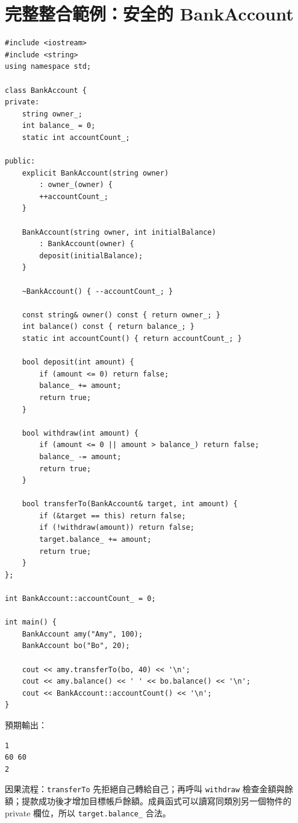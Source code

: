 \documentclass[11pt,a4paper]{article}
\newcommand{\code}[1]{\texttt{#1}}
\begin{document}
\section{完整整合範例：安全的 BankAccount}

\begin{lstlisting}
#include <iostream>
#include <string>
using namespace std;

class BankAccount {
private:
    string owner_;
    int balance_ = 0;
    static int accountCount_;

public:
    explicit BankAccount(string owner)
        : owner_(owner) {
        ++accountCount_;
    }

    BankAccount(string owner, int initialBalance)
        : BankAccount(owner) {
        deposit(initialBalance);
    }

    ~BankAccount() { --accountCount_; }

    const string& owner() const { return owner_; }
    int balance() const { return balance_; }
    static int accountCount() { return accountCount_; }

    bool deposit(int amount) {
        if (amount <= 0) return false;
        balance_ += amount;
        return true;
    }

    bool withdraw(int amount) {
        if (amount <= 0 || amount > balance_) return false;
        balance_ -= amount;
        return true;
    }

    bool transferTo(BankAccount& target, int amount) {
        if (&target == this) return false;
        if (!withdraw(amount)) return false;
        target.balance_ += amount;
        return true;
    }
};

int BankAccount::accountCount_ = 0;

int main() {
    BankAccount amy("Amy", 100);
    BankAccount bo("Bo", 20);

    cout << amy.transferTo(bo, 40) << '\n';
    cout << amy.balance() << ' ' << bo.balance() << '\n';
    cout << BankAccount::accountCount() << '\n';
}
\end{lstlisting}

預期輸出：
\begin{lstlisting}[language={}]
1
60 60
2
\end{lstlisting}

因果流程：\code{transferTo} 先拒絕自己轉給自己；再呼叫 \code{withdraw} 檢查金額與餘額；提款成功後才增加目標帳戶餘額。成員函式可以讀寫同類別另一個物件的 private 欄位，所以 \code{target.balance\_} 合法。
\end{document}

